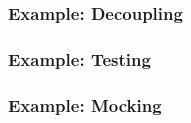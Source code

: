 \documentclass{beamer}
\begin{document}


\begin{frame}[fragile]
\frametitle{Example: Decoupling}

\end{frame}

\begin{frame}[fragile]
\frametitle{Example: Testing}

\end{frame}

\begin{frame}[fragile]
\frametitle{Example: Mocking}

\end{frame}
\end{document}
